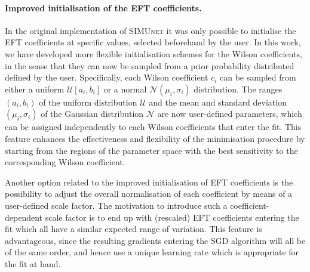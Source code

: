 \documentclass[withindex,glossary]{cam-thesis}
\newcommand{\simunet}{\textsc{SIMUnet}}
\begin{document}
\paragraph{Improved initialisation of the EFT coefficients.}
%
In the original implementation of \simunet{} it was only possible
to initialise the EFT coefficients at specific values, selected beforehand
by the user.
%
In this work, we have developed more flexible initialisation schemes for the Wilson
coefficients, in the sense that they can now be sampled from a prior probability
distributed defined by the user.
%
Specifically, each Wilson coefficient $c_i$ can be
sampled from either a uniform $\mathcal{U} [a_i, b_i]$ or a normal $\mathcal{N}(\mu_i,
\sigma_i)$ distribution.
%
The ranges  $(a_i, b_i)$  of the uniform distribution $\mathcal{U}$
and the mean and standard deviation $(\mu_i, \sigma_i)$ of the Gaussian
distribution $\mathcal{N}$ are now user-defined parameters, which can
be assigned independently to each Wilson coefficients that enter the fit.
%
This feature enhances the effectiveness and flexibility of the minimisation procedure by
starting from the regions of the parameter space with the best sensitivity
to the corresponding Wilson coefficient.

Another option related to the improved initialisation of EFT coefficients
is the possibility to adjust the overall normalisation of each coefficient
by means of a user-defined scale factor.
%
The motivation to introduce such a coefficient-dependent scale factor
is to end up with (rescaled) EFT coefficients entering the fit which all have
a similar expected range of variation.
%
This feature is advantageous, since the resulting gradients entering the SGD algorithm
will all be of the same order, and hence use a unique learning rate which is appropriate for the fit at hand.
%

\end{document}
